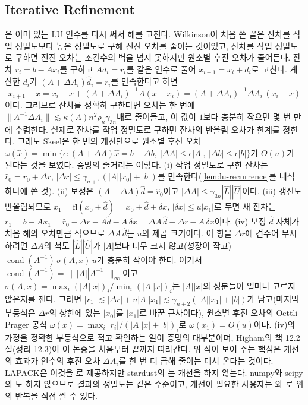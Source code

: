 \subsection{Iterative Refinement}

은 이미 있는 LU 인수를 다시 써서 해를 고친다. Wilkinson이 처음 쓴 꼴은 잔차를 작업 정밀도보다 높은 정밀도로 구해 전진 오차를 줄이는 것이었고, 잔차를 작업 정밀도로 구하면 전진 오차는 조건수의 벽을 넘지 못하지만 원소별 후진 오차가 줄어든다. 잔차 $r_i=b-Ax_i$를 구하고 $Ad_i=r_i$를 같은 인수로 풀어 $x_{i+1}=x_i+d_i$로 고친다. 계산한 $d_i$가 $(A+\Delta A_i)\hat d_i=r_i$를 만족한다고 하면
\[
x_{i+1}-x=x_i-x+(A+\Delta A_i)^{-1}A(x-x_i)=(A+\Delta A_i)^{-1}\Delta A_i\,(x_i-x)
\]
이다. 그러므로 잔차를 정확히 구한다면 오차는 한 번에 $\|A^{-1}\Delta A_i\|\lesssim\kappa(A)n^2\rho_n\gamma_{3n}$배로 줄어들고, 이 값이 $1$보다 충분히 작으면 몇 번 만에 수렴한다. 실제로 잔차를 작업 정밀도로 구하면 잔차의 반올림 오차가 한계를 정한다. 그래도 Skeel은 한 번의 개선만으로 원소별 후진 오차 $\omega(\hat x)=\min\{\epsilon:(A+\Delta A)\hat x=b+\Delta b,\ |\Delta A|\le\epsilon|A|,\ |\Delta b|\le\epsilon|b|\}$가 $O(u)$가 된다는 것을 보였다\cite{skeel1980refinement}. 증명의 줄거리는 이렇다. (i) 작업 정밀도로 구한 잔차는 $\hat r_0=r_0+\Delta r$, $|\Delta r|\le\gamma_{n+1}(|A||x_0|+|b|)$를 만족한다(\cref{lem:lu-recurrence}를 내적 하나에 쓴 것). (ii) 보정은 $(A+\Delta A)\hat d=\hat r_0$이고 $|\Delta A|\le\gamma_{3n}|\hat L||\hat U|$이다. (iii) 갱신도 반올림되므로 $x_1=\mathrm{fl}(x_0+\hat d)=x_0+\hat d+\delta x$, $|\delta x|\le u|x_1|$로 두면 새 잔차는 $r_1=b-Ax_1=\hat r_0-\Delta r-A\hat d-A\,\delta x=\Delta A\,\hat d-\Delta r-A\,\delta x$이다. (iv) 보정 $\hat d$ 자체가 처음 해의 오차만큼 작으므로 $\Delta A\,\hat d$는 $u$의 제곱 크기이다. 이 항을 $\Delta r$에 견주어 무시하려면 $\Delta A$의 척도 $|\hat L||\hat U|$가 $|A|$보다 너무 크지 않고(성장이 작고) $\operatorname{cond}(A^{-1})\,\sigma(A,x)\,u$가 충분히 작아야 한다. 여기서 $\operatorname{cond}(A^{-1})=\|\,|A||A^{-1}|\,\|_\infty$이고 $\sigma(A,x)=\max_i(|A||x|)_i/\min_i(|A||x|)_i$는 $|A||x|$의 성분들이 얼마나 고르지 않은지를 잰다. 그러면 $|r_1|\lesssim|\Delta r|+u|A||x_1|\lesssim\gamma_{n+2}(|A||x_1|+|b|)$가 남고(마지막 부등식은 $\Delta r$의 상한에 있는 $|x_0|$를 $|x_1|$로 바꾼 근사이다), 원소별 후진 오차의 Oettli--Prager 공식 $\omega(x)=\max_i|r_i|/(|A||x|+|b|)_i$로 $\omega(x_1)=O(u)$이다. (iv)의 가정을 정확한 부등식으로 적고 확인하는 일이 증명의 대부분이며, Higham의 책 12.2절(정리 12.3)이 이 논증을 처음부터 끝까지 따라간다\cite{higham2002accuracy}. 위 식이 보여 주는 핵심은 개선의 효과가 인수의 후진 오차 $\Delta A_i$를 한 번 더 곱해 줄이는 데서 온다는 것이다. LAPACK은 이것을 로 제공하지만 stardust의 는 개선을 하지 않는다. numpy와 scipy의 도 하지 않으므로 결과의 정밀도는 같은 수준이고, 개선이 필요한 사용자는 와 로 위의 반복을 직접 짤 수 있다.
